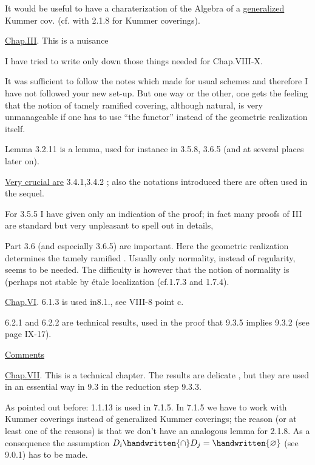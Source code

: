 It would be useful to have a charaterization of the Algebra of a \uline{generalized} Kummer cov. (cf. with 2.1.8 for Kummer coverings).

\uline{Chap.III}. This is a nuisance\handwritten{!}

I have tried to write only down those things needed for Chap.VIII-X.

It was sufficient to follow the notes which  made for usual schemes and therefore I have not followed your new set-up. But one way or the other, one gets the feeling that the notion of tamely ramified covering, although natural, is very unmanageable if one has to use ``the functor'' instead of the geometric realization itself.

Lemma 3.2.11 is a  lemma, used for instance in 3.5.8, 3.6.5 (and  at several places later on).

\uline{Very crucial are}  3.4.1,3.4.2 ; also the notations introduced there are often used in the sequel.

For 3.5.5 I have given only an indication of the proof; in fact many proofs of III are standard but very unpleasant to spell out in  details,

Part 3.6 (and especially 3.6.5) are important. Here the geometric realization determines the tamely ramified . Usually only normality, instead of regularity, seems to be needed. The difficulty is however that the notion of normality is (perhaps not stable by étale localization (cf.1.7.3 and 1.7.4).

\uline{Chap.VI}.  6.1.3 is used in8.1., see VIII-8 point c.

6.2.1 and 6.2.2 are technical results, used in the proof that 9.3.5 implies 9.3.2 (see  page IX-17).



\uline{Comments}

\uline{Chap.VII}. This is a technical chapter. The results are delicate , but they are used in an essential way in 9.3 in the reduction step 9.3.3.

As pointed out before: 1.1.13 is used in 7.1.5. In 7.1.5 we have to work with Kummer coverings instead of generalized Kummer coverings; the reason (or at least one of the reasons) is that we don't have an analogous lemma for 2.1.8. As a consequence the assumption $D_i\handwritten{\cap}D_j=\handwritten{\varnothing}$ (see 9.0.1) has to be made.

